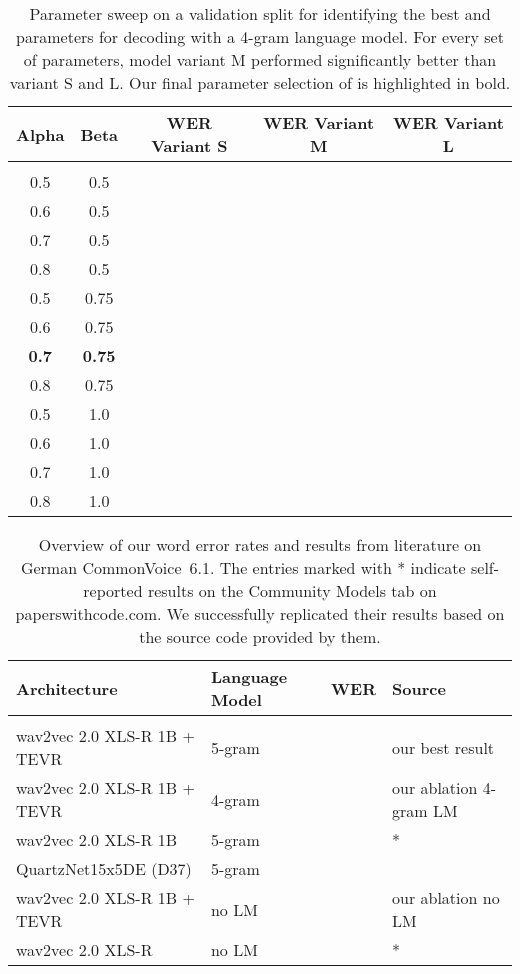 \documentclass{article} \usepackage{iclr2022_conference,times}
\begin{document}
\begin{table}[p]
\begin{center}
\begin{tabular}{cc ccc}
Alpha & Beta & WER Variant S & WER Variant M & WER Variant L \\
\hline \\
0.5 & 0.5 &  &  &  \\
0.6 & 0.5 &  &  &  \\
0.7 & 0.5 &  &  &  \\
0.8 & 0.5 &  &  &  \\
0.5 & 0.75 &  &  &  \\
0.6 & 0.75 &  &  &  \\
\textbf{0.7} & \textbf{0.75} &  &  &  \\
0.8 & 0.75 &  &  &  \\
0.5 & 1.0 &  &  &  \\
0.6 & 1.0 &  &  &  \\
0.7 & 1.0 &  &  &  \\
0.8 & 1.0 &  &  &  
\end{tabular}
\end{center}
\caption{Parameter sweep on a validation split for identifying the best  and  parameters for decoding with a 4-gram language model. For every set of parameters, model variant M performed significantly better than variant S and L. Our final parameter selection of   is highlighted in bold.}
\label{table-results-4g-wer}
\end{table}


\begin{table}[p]
\begin{center}
\begin{tabular}{l l l l}
Architecture & Language Model & WER & Source \\
\hline \\
wav2vec 2.0 XLS-R 1B + TEVR & 5-gram &  & our best result \\
wav2vec 2.0 XLS-R 1B + TEVR & 4-gram &  & our ablation 4-gram LM \\
wav2vec 2.0 XLS-R 1B & 5-gram &  & \citet{flozi} * \\
QuartzNet15x5DE (D37) & 5-gram &  & \citet{scribosermo} \\
wav2vec 2.0 XLS-R 1B + TEVR & no LM &  & our ablation no LM \\
wav2vec 2.0 XLS-R & no LM &  & \citet{grosman} * \\
\end{tabular}
\end{center}
\caption{Overview of our word error rates and results from literature on German CommonVoice~6.1. The entries marked with * indicate self-reported results on the Community Models tab on paperswithcode.com. We successfully replicated their results based on the source code provided by them.}
\label{table-results-final-wer}
\end{table}
\end{document}
